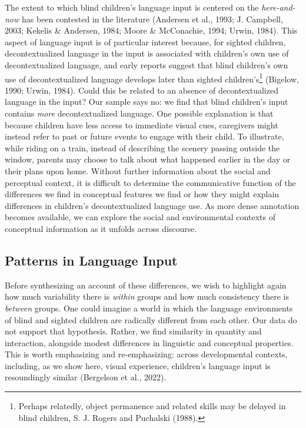 \documentclass[
  man]{apa6}
\begin{document}
The extent to which blind children's language input is centered on the \emph{here-and-now} has been contested in the literature (Andersen et al., 1993; J. Campbell, 2003; Kekelis \& Andersen, 1984; Moore \& McConachie, 1994; Urwin, 1984). This aspect of language input is of particular interest because, for sighted children, decontextualized language in the input is associated with children's own use of decontextualized language, and early reports suggest that blind children's own use of decontextualized language develops later than sighted children's\footnote{Perhaps relatedly, object permanence and related skills may be delayed in blind children, S. J. Rogers and Puchalski (1988).} (Bigelow, 1990; Urwin, 1984). Could this be related to an absence of decontextualized language in the input? Our sample says no: we find that blind children's input contains \emph{more} decontextualized language. One possible explanation is that because children have less access to immediate visual cues, caregivers might instead refer to past or future events to engage with their child. To illustrate, while riding on a train, instead of describing the scenery passing outside the window, parents may choose to talk about what happened earlier in the day or their plans upon home. Without further information about the social and perceptual context, it is difficult to determine the communicative function of the differences we find in conceptual features we find or how they might explain differences in children's decontextualized language use. As more dense annotation becomes available, we can explore the social and environmental contexts of conceptual information as it unfolds across discourse.

\hypertarget{patterns-in-language-input}{%
\subsection{Patterns in Language Input}\label{patterns-in-language-input}}

Before synthesizing an account of these differences, we wish to highlight again how much variability there is \emph{within} groups and how much consistency there is \emph{between} groups. One could imagine a world in which the language environments of blind and sighted children are radically different from each other. Our data do not support that hypothesis. Rather, we find similarity in quantity and interaction, alongside modest differences in linguistic and conceptual properties. This is worth emphasizing and re-emphasizing: across developmental contexts, including, as we show here, visual experience, children's language input is resoundingly similar (Bergelson et al., 2022).
\end{document}
